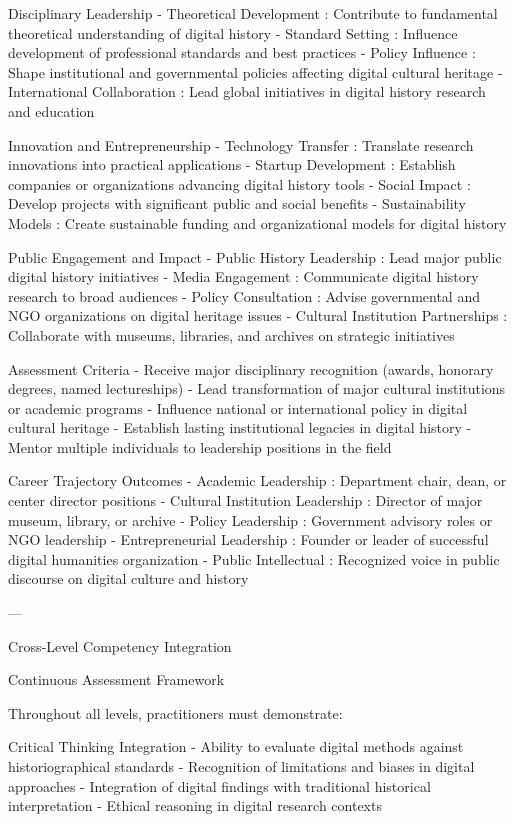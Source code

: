 \begin{appendices}
     Disciplinary Leadership
-  Theoretical Development : Contribute to fundamental theoretical understanding of digital history
-  Standard Setting : Influence development of professional standards and best practices
-  Policy Influence : Shape institutional and governmental policies affecting digital cultural heritage
-  International Collaboration : Lead global initiatives in digital history research and education

     Innovation and Entrepreneurship
-  Technology Transfer : Translate research innovations into practical applications
-  Startup Development : Establish companies or organizations advancing digital history tools
-  Social Impact : Develop projects with significant public and social benefits
-  Sustainability Models : Create sustainable funding and organizational models for digital history

     Public Engagement and Impact
-  Public History Leadership : Lead major public digital history initiatives
-  Media Engagement : Communicate digital history research to broad audiences
-  Policy Consultation : Advise governmental and NGO organizations on digital heritage issues
-  Cultural Institution Partnerships : Collaborate with museums, libraries, and archives on strategic initiatives

    Assessment Criteria
- Receive major disciplinary recognition (awards, honorary degrees, named lectureships)
- Lead transformation of major cultural institutions or academic programs
- Influence national or international policy in digital cultural heritage
- Establish lasting institutional legacies in digital history
- Mentor multiple individuals to leadership positions in the field

    Career Trajectory Outcomes
-  Academic Leadership : Department chair, dean, or center director positions
-  Cultural Institution Leadership : Director of major museum, library, or archive
-  Policy Leadership : Government advisory roles or NGO leadership
-  Entrepreneurial Leadership : Founder or leader of successful digital humanities organization
-  Public Intellectual : Recognized voice in public discourse on digital culture and history

---

   Cross-Level Competency Integration

    Continuous Assessment Framework

Throughout all levels, practitioners must demonstrate:

      Critical Thinking Integration 
- Ability to evaluate digital methods against historiographical standards
- Recognition of limitations and biases in digital approaches
- Integration of digital findings with traditional historical interpretation
- Ethical reasoning in digital research contexts


\end{appendices}
